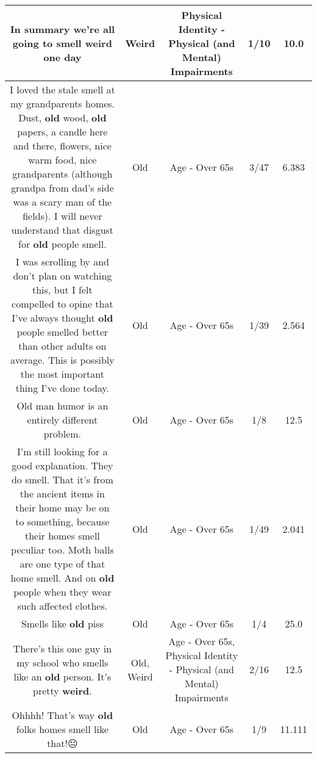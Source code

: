 \documentclass[11pt]{article}
\newlength\mylength
\begin{document}
\begin{center}
\begin{longtable}{|C{.65\mylength}|C{.30\mylength}|C{.12\mylength}|C{.12\mylength}|C{.12\mylength}|}
  \small In summary we're all going to smell \textbf{weird} one day\normalsize   & Weird & Physical Identity - Physical (and Mental) Impairments & 1/10 & 10.0 \\  \hline
  \small I loved the stale smell at my grandparents homes. Dust, \textbf{old} wood, \textbf{old} papers, a candle here and there, flowers, nice warm food, nice grandparents (although grandpa from dad's side was a scary man of the fields). I will never understand that disgust for \textbf{old} people smell.\normalsize   & Old & Age - Over 65s & 3/47 & 6.383 \\  \hline
  \small I was scrolling by and don't plan on watching this, but I felt compelled to opine that I've always thought \textbf{old} people smelled better than other adults on average. This is possibly the most important thing I've done today.\normalsize   & Old & Age - Over 65s & 1/39 & 2.564 \\  \hline
  \small Old man humor is an entirely different problem.\normalsize   & Old & Age - Over 65s & 1/8 & 12.5 \\  \hline
  \small I'm still looking for a good explanation. They do smell. That it's from the ancient items in their home may be on to something, because their homes smell peculiar too. Moth balls are one type of that home smell. And on \textbf{old} people when they wear such affected clothes.\normalsize   & Old & Age - Over 65s & 1/49 & 2.041 \\  \hline
  \small Smells like \textbf{old} piss\normalsize   & Old & Age - Over 65s & 1/4 & 25.0 \\  \hline
  \small There's this one guy in my school who smells like an \textbf{old} person. It's pretty \textbf{weird}.\normalsize   & Old, Weird & Age - Over 65s, Physical Identity - Physical (and Mental) Impairments & 2/16 & 12.5 \\  \hline
  \small Ohhhh! That's way \textbf{old} folks homes smell like that!😐\normalsize   & Old & Age - Over 65s & 1/9 & 11.111 \\  \hline

\end{longtable}
\end{center}
\end{document}
